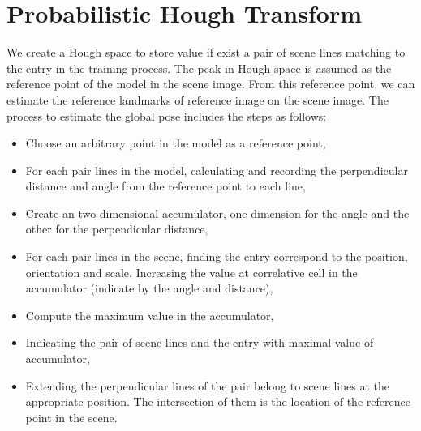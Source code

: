 \section{Probabilistic Hough Transform}
We create a Hough space to store value if exist a pair of scene lines matching to the entry in the training process. The peak in Hough space is assumed as the reference point of the model in the scene image. From this reference point, we can estimate the reference landmarks of reference image on the scene image.
The process to estimate the global pose includes the steps as follows:
\begin{itemize}
\item Choose an arbitrary point in the model as a reference point,
\item For each pair lines in the model, calculating and recording the perpendicular distance and angle from the reference point to each line,
\item Create an two-dimensional accumulator, one dimension for the angle and the other for the perpendicular distance,
\item For each pair lines in the scene, finding the entry correspond to the position, orientation and scale. Increasing the value at correlative cell in the accumulator (indicate by the angle and distance),
\item Compute the maximum value in the accumulator,
\item Indicating the pair of scene lines and the entry with maximal value of accumulator,
\item Extending the perpendicular lines of the pair belong to scene lines at the appropriate position. The intersection of them is the location of the reference point in the scene.
\end{itemize}
